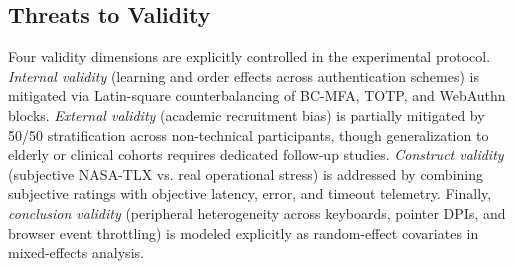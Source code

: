 \subsection{Threats to Validity}
Four validity dimensions are explicitly controlled in the experimental protocol. \textit{Internal validity} (learning and order effects across authentication schemes) is mitigated via Latin-square counterbalancing of BC-MFA, TOTP, and WebAuthn blocks. \textit{External validity} (academic recruitment bias) is partially mitigated by 50/50 stratification across non-technical participants, though generalization to elderly or clinical cohorts requires dedicated follow-up studies. \textit{Construct validity} (subjective NASA-TLX vs. real operational stress) is addressed by combining subjective ratings with objective latency, error, and timeout telemetry. Finally, \textit{conclusion validity} (peripheral heterogeneity across keyboards, pointer DPIs, and browser event throttling) is modeled explicitly as random-effect covariates in mixed-effects analysis.
